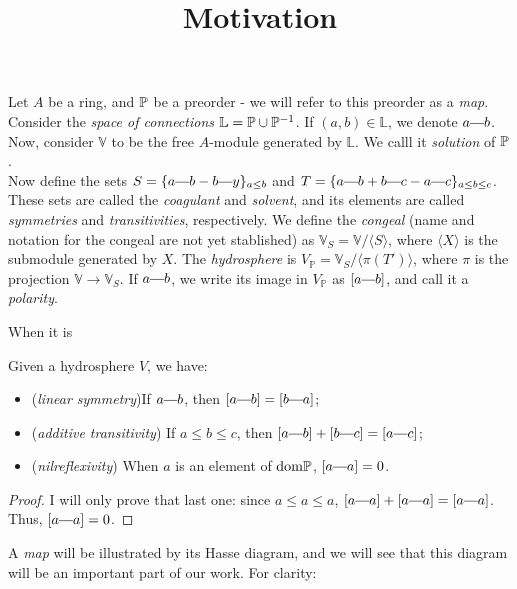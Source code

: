 


\title{Motivation}


	\maketitle
\begin{definition}
    Let $A$ be a ring, and $\mathbb{P}$ be a preorder - we will refer to this preorder
    as a \textit{map}. 
    Consider the \textit{space of connections} $\mathbb{L} = \mathbb{P} \cup \mathbb{P}^{-1}$.
    If $(a, b) \in \mathbb{L}$, we denote $a \connect b$.
    Now, consider $\mathbb{V}$ to be the free $A$-module generated by $\mathbb{L}$.
    We calll it \textit{solution} of $\mathbb{P}$.\\
    Now define the sets $S = \{ a \connect b - b \connect y\}_{a \leq b}$ and $T = \{ a \connect b + b \connect c - a \connect c\}_{a \leq b \leq c}$. These sets are called the \textit{coagulant} and \textit{solvent}, and its elements are called \textit{symmetries} and \textit{transitivities}, respectively. We define the \textit{congeal} (name and notation for the congeal are not yet stablished) as $\mathbb{V}_S = \mathbb{V} / \langle S \rangle$, where $\langle X \rangle$ is the submodule generated by $X$. The \textit{hydrosphere} is $V_\mathbb{P} = \mathbb{V}_S/\langle \pi(T') \rangle$, where $\pi$ is the projection $\mathbb{V} \to \mathbb{V}_S$. If $a \connect b$, we write its image in $V_\mathbb{P}$ as $[a \connect b]$, and call it a \textit{polarity}.
\end{definition}
\par When it is
\begin{prop}
	Given a hydrosphere $V$, we have:
	\begin{itemize}
		\item (\textit{linear symmetry})If $a \connect b$, then $[a \connect b] = [b \connect a]$;
		\item (\textit{additive transitivity}) If $a \leq b \leq c$, then $[a \connect b] + [b \connect c] = [a \connect c]$;
		\item(\textit{nilreflexivity}) When $a$ is an element of $\text{dom} \mathbb{P}$, $[a \connect a] = 0$.
	\end{itemize}
\end{prop}
\begin{proof}
	I will only prove that last one: since $a \leq a \leq a$, $[a \connect a] + [a \connect a] = [a \connect a]$. Thus, $[a \connect a] = 0$.
\end{proof}
\par A \textit{map} will be illustrated by its Hasse diagram, and we will see that this diagram will be an important part of our work. For clarity:
